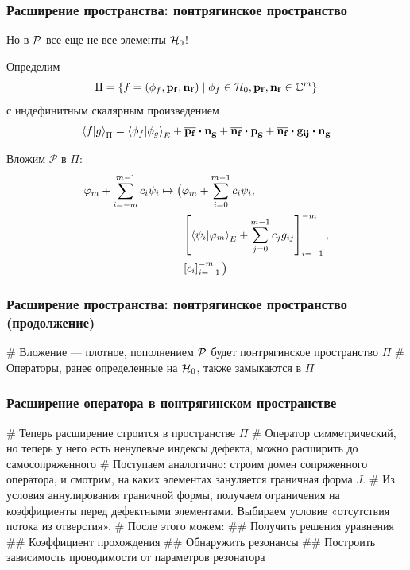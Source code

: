\documentclass{beamer}
\begin{document}
\begin{frame}[fragile]
\frametitle{Расширение пространства: понтрягинское пространство}
Но в $\mathcal{P}$ все еще не все элементы $\mathcal{H}_{0}$!

Определим 
\[
\Pi = \{f = (\phi_f, \vb{p_f}, \vb{n_f}) \mid \phi_f \in \mathcal{H}_{0}, \vb{p_f}, \vb{n_f} \in \mathbb{C}^m \}
\]
с индефинитным скалярным произведением
\[
\ip{f}{g}_\Pi =
\ip{\phi_f}{\phi_g}_E +
\cconj{\vb{p_f}} \vdot \vb{n_g} +
\cconj{\vb{n_f}} \vdot \vb{p_g} + 
\cconj{\vb{n_f}} \vdot \vb{g_{ij}} \vdot \vb{n_g}
\]

Вложим $\mathcal{P}$ в $\Pi$:
\begin{align*}
\varphi_m + \sum\limits_{i = -m}^{m - 1} c_i \psi_i \mapsto
\big(
& \varphi_m + \sum\limits_{i = 0}^{m - 1} c_i \psi_i, \\
& \left[ \ip{\psi_i}{\varphi_m}_E + \sum\limits_{j = 0}^{m - 1} c_j g_{ij} \right]_{i = -1}^{-m}, \\
& \left[ c_i \right]_{i = -1}^{-m}  \big)
\end{align*}
\end{frame}

\begin{frame}[fragile]
\frametitle{Расширение пространства: понтрягинское пространство (продолжение)}
\begin{easylist}[itemize]
# Вложение — плотное, пополнением $\mathcal{P}$ будет понтрягинское пространство $\Pi$
# Операторы, ранее определенные на $\mathcal{H}_{0}$, также замыкаются в $\Pi$
\end{easylist}
\end{frame}

\begin{frame}[fragile]
\frametitle{Расширение оператора в понтрягинском пространстве}
\begin{easylist}[itemize]
# Теперь расширение строится в пространстве $\Pi$
# Оператор симметрический, но теперь у него есть ненулевые индексы дефекта, можно расширить до самосопряженного
# Поступаем аналогично: строим домен сопряженного оператора, и смотрим, на каких элементах зануляется граничная форма $J$. 
# Из условия аннулирования граничной формы, получаем ограничения на коэффициенты перед дефектными элементами. Выбираем условие «отсутствия потока из отверстия».
# После этого можем:
## Получить решения уравнения
## Коэффициент прохождения
## Обнаружить резонансы
## Построить зависимость проводимости от параметров резонатора
\end{easylist}
\end{frame}
\end{document}
